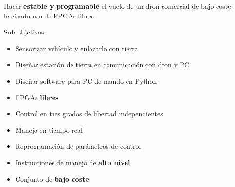 \documentclass[a4,landscpae]{seminar}
\begin{document}
\begin{hslide}
Hacer \textbf{estable y programable} el vuelo de un dron comercial de
bajo coste haciendo uso de FPGAs libres

Sub-objetivos:
	\begin{itemize}
		\item Sensorizar veh\'iculo y enlazarlo con tierra
		\item Dise\~nar estaci\'on de tierra en comunicaci\'on con dron y PC
		\item Dise\~nar software para PC de mando en Python
	\end{itemize}
\end{hslide}
\begin{hslide}
	\begin{itemize}
		\item FPGAs \textbf{libres}
		\item Control en tres grados de libertad independientes
		\item Manejo en tiempo real
		\item Reprogramaci\'on de par\'ametros de control
		\item Instrucciones de manejo de \textbf{alto nivel}
		\item Conjunto de \textbf{bajo coste}
	\end{itemize}
\end{hslide}
\end{document}
